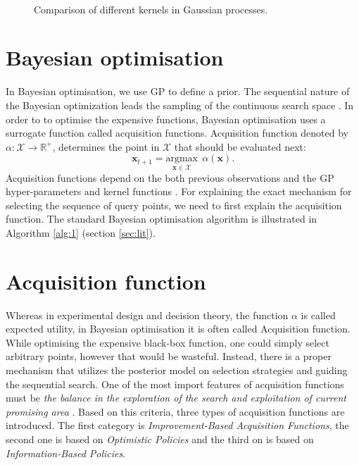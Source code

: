\begin{figure} 
    \centering
    \label{1a}\hfill
    \label{1b}\\
    \label{1c}\hfill
     \label{1d} 
    \label{1c}\hfill
    \label{1c}\hfill
  \caption{Comparison of different kernels in Gaussian processes.}
  \label{fig:kernel} 
\end{figure}
\newpage
\section{Bayesian optimisation}
In Bayesian optimisation, we use GP to define a prior. The sequential nature of the Bayesian optimization leads the sampling of the continuous search space \cite{rasmussen2004gaussian}. In order to to optimise the expensive functions, Bayesian optimisation uses a surrogate function
called acquisition functions. Acquisition function denoted by $\alpha: \mathcal{X} \rightarrow \mathbb{R}^+$, determines the point in $\mathcal{X}$ that should be evaluated next:
\begin{equation}
\textbf{x}_{t+1} = \underset{\textbf{x}   \in \mathcal{X}}{\mathrm{argmax}}\ \ \alpha(\textbf{x}).
\end{equation}
Acquisition functions depend on the both previous observations and the GP hyper-parameters and kernel functions \cite{snoek2012practical}. 
For explaining the exact mechanism for selecting  the sequence of query points, we need to first explain the acquisition function.
The standard Bayesian optimisation algorithm is illustrated in Algorithm \ref{alg:1} (section \ref{sec:lit}).

\section{Acquisition function}
Whereas in experimental design and decision theory, the function $\alpha$  is called expected utility,  in Bayesian optimisation it is often called Acquisition function. While optimising the expensive black-box function, one could simply select arbitrary points, however that would be wasteful. Instead, there is a proper mechanism that utilizes the posterior model on selection strategies and guiding the sequential search.‌ One of the most import features of acquisition functions must be \textit{the balance in the exploration of the search and exploitation of current promising area} \cite{shahriari2016taking}. Based on this criteria, three types of acquisition functions are introduced. The first category is \textit{Improvement-Based Acquisition Functions}, the second one is based on \textit{Optimistic Policies}\cite{shahriari2016taking} and the third on is based on \textit{Information-Based Policies}. 
